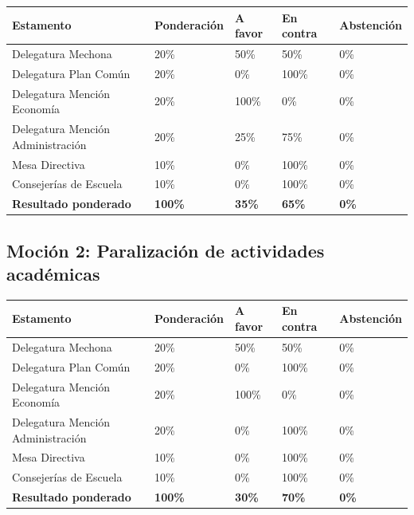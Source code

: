 \documentclass[12pt,letterpaper]{article}
\begin{document}
\begin{center}
\small\setlength{\tabcolsep}{4pt}
\begin{tabular}{L{6.3cm} C{2.4cm} C{1.8cm} C{1.9cm} C{2.2cm}}
  \toprule
  \textbf{Estamento} & \textbf{Ponderación} & \textbf{A favor} & \textbf{En contra} & \textbf{Abstención} \\
  \midrule
  Delegatura Mechona                & 20\% & 50\%  & 50\%  & 0\% \\
  Delegatura Plan Común             & 20\% & 0\%   & 100\% & 0\% \\
  Delegatura Mención Economía       & 20\% & 100\% & 0\%   & 0\% \\
  Delegatura Mención Administración & 20\% & 25\%  & 75\%  & 0\% \\
  Mesa Directiva                    & 10\% & 0\%   & 100\% & 0\% \\
  Consejerías de Escuela            & 10\% & 0\%   & 100\% & 0\% \\
  \midrule
  \textbf{Resultado ponderado}      & \textbf{100\%} & \textbf{35\%} & \textbf{65\%} & \textbf{0\%} \\
  \bottomrule
\end{tabular}
\end{center}

\subsection{Moción 2: Paralización de actividades académicas}

\begin{center}
\small\setlength{\tabcolsep}{4pt}
\begin{tabular}{L{6.3cm} C{2.4cm} C{1.8cm} C{1.9cm} C{2.2cm}}
  \toprule
  \textbf{Estamento} & \textbf{Ponderación} & \textbf{A favor} & \textbf{En contra} & \textbf{Abstención} \\
  \midrule
  Delegatura Mechona                & 20\% & 50\%  & 50\%  & 0\% \\
  Delegatura Plan Común             & 20\% & 0\%   & 100\% & 0\% \\
  Delegatura Mención Economía       & 20\% & 100\% & 0\%   & 0\% \\
  Delegatura Mención Administración & 20\% & 0\%   & 100\% & 0\% \\
  Mesa Directiva                    & 10\% & 0\%   & 100\% & 0\% \\
  Consejerías de Escuela            & 10\% & 0\%   & 100\% & 0\% \\
  \midrule
  \textbf{Resultado ponderado}      & \textbf{100\%} & \textbf{30\%} & \textbf{70\%} & \textbf{0\%} \\
  \bottomrule
\end{tabular}
\end{center}
\end{document}
